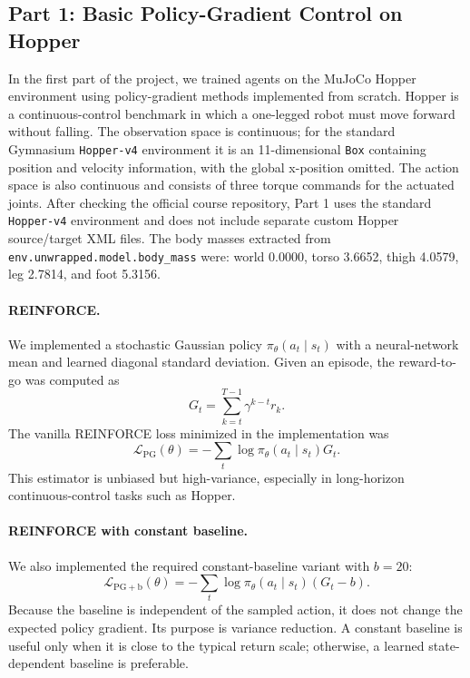 \subsection{Part 1: Basic Policy-Gradient Control on Hopper}

In the first part of the project, we trained agents on the MuJoCo Hopper environment using policy-gradient methods implemented from scratch. Hopper is a continuous-control benchmark in which a one-legged robot must move forward without falling. The observation space is continuous; for the standard Gymnasium \texttt{Hopper-v4} environment it is an 11-dimensional \texttt{Box} containing position and velocity information, with the global x-position omitted. The action space is also continuous and consists of three torque commands for the actuated joints. After checking the official course repository, Part 1 uses the standard \texttt{Hopper-v4} environment and does not include separate custom Hopper source/target XML files. The body masses extracted from \texttt{env.unwrapped.model.body\_mass} were: world 0.0000, torso 3.6652, thigh 4.0579, leg 2.7814, and foot 5.3156.

\paragraph{REINFORCE.}
We implemented a stochastic Gaussian policy $\pi_\theta(a_t \mid s_t)$ with a neural-network mean and learned diagonal standard deviation. Given an episode, the reward-to-go was computed as
\begin{equation}
G_t = \sum_{k=t}^{T-1} \gamma^{k-t} r_k .
\end{equation}
The vanilla REINFORCE loss minimized in the implementation was
\begin{equation}
\mathcal{L}_{\mathrm{PG}}(\theta)
= - \sum_t \log \pi_\theta(a_t \mid s_t) G_t .
\end{equation}
This estimator is unbiased but high-variance, especially in long-horizon continuous-control tasks such as Hopper.

\paragraph{REINFORCE with constant baseline.}
We also implemented the required constant-baseline variant with $b = 20$:
\begin{equation}
\mathcal{L}_{\mathrm{PG+b}}(\theta)
= - \sum_t \log \pi_\theta(a_t \mid s_t) (G_t - b).
\end{equation}
Because the baseline is independent of the sampled action, it does not change the expected policy gradient. Its purpose is variance reduction. A constant baseline is useful only when it is close to the typical return scale; otherwise, a learned state-dependent baseline is preferable.

